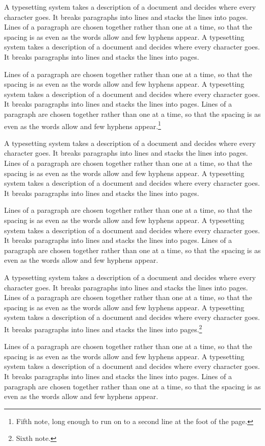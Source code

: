 \documentclass{article}
\begin{document}
A typesetting system takes a description of a document and decides where every character goes. It breaks paragraphs into lines and stacks the lines into pages. Lines of a paragraph are chosen together rather than one at a time, so that the spacing is as even as the words allow and few hyphens appear. A typesetting system takes a description of a document and decides where every character goes. It breaks paragraphs into lines and stacks the lines into pages.

Lines of a paragraph are chosen together rather than one at a time, so that the spacing is as even as the words allow and few hyphens appear. A typesetting system takes a description of a document and decides where every character goes. It breaks paragraphs into lines and stacks the lines into pages. Lines of a paragraph are chosen together rather than one at a time, so that the spacing is as even as the words allow and few hyphens appear.\footnote{Fifth note, long enough to run on to a second line at the foot of the page.}

A typesetting system takes a description of a document and decides where every character goes. It breaks paragraphs into lines and stacks the lines into pages. Lines of a paragraph are chosen together rather than one at a time, so that the spacing is as even as the words allow and few hyphens appear. A typesetting system takes a description of a document and decides where every character goes. It breaks paragraphs into lines and stacks the lines into pages.

Lines of a paragraph are chosen together rather than one at a time, so that the spacing is as even as the words allow and few hyphens appear. A typesetting system takes a description of a document and decides where every character goes. It breaks paragraphs into lines and stacks the lines into pages. Lines of a paragraph are chosen together rather than one at a time, so that the spacing is as even as the words allow and few hyphens appear.

A typesetting system takes a description of a document and decides where every character goes. It breaks paragraphs into lines and stacks the lines into pages. Lines of a paragraph are chosen together rather than one at a time, so that the spacing is as even as the words allow and few hyphens appear. A typesetting system takes a description of a document and decides where every character goes. It breaks paragraphs into lines and stacks the lines into pages.\footnote{Sixth note.}

Lines of a paragraph are chosen together rather than one at a time, so that the spacing is as even as the words allow and few hyphens appear. A typesetting system takes a description of a document and decides where every character goes. It breaks paragraphs into lines and stacks the lines into pages. Lines of a paragraph are chosen together rather than one at a time, so that the spacing is as even as the words allow and few hyphens appear.
\end{document}
